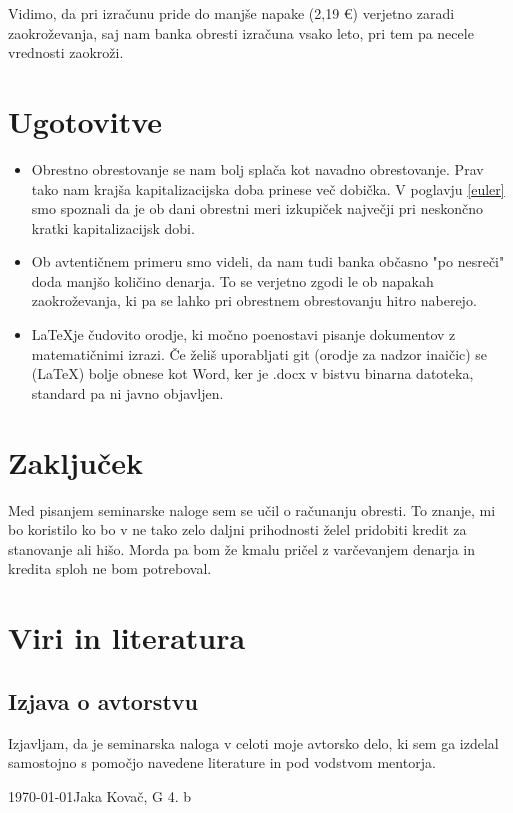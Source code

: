 \documentclass[12pt]{article}
\begin{document}
    Vidimo, da pri izračunu pride do manjše napake (2,19 €) verjetno zaradi zaokroževanja,
    saj nam banka obresti izračuna vsako leto, pri tem pa necele vrednosti zaokroži.

    \newpage

\section{Ugotovitve}
    \begin{itemize}
        \item Obrestno obrestovanje se nam bolj splača kot navadno obrestovanje. Prav tako nam
        krajša kapitalizacijska doba prinese več dobička. V poglavju \ref{euler} smo spoznali
        da je ob dani obrestni meri izkupiček največji pri neskončno kratki kapitalizacijsk dobi.
        \item Ob avtentičnem primeru smo videli, da nam tudi banka občasno "po nesreči" doda
        manjšo količino denarja. To se verjetno zgodi le ob napakah zaokroževanja, ki pa se lahko 
        pri obrestnem obrestovanju hitro naberejo.
        \item \LaTeX je čudovito orodje, ki močno poenostavi pisanje dokumentov z matematičnimi
        izrazi. Če želiš uporabljati git (orodje za nadzor inaičic) se (\LaTeX) bolje obnese kot Word,
        ker je .docx v bistvu binarna datoteka, standard pa ni javno objavljen.
    \end{itemize}

\newpage
\section{Zaključek}
    Med pisanjem seminarske naloge sem se učil o računanju obresti. To znanje, mi bo koristilo
    ko bo v ne tako zelo daljni prihodnosti želel pridobiti kredit za stanovanje ali hišo.
    Morda pa bom že kmalu pričel z varčevanjem denarja in kredita sploh ne bom potreboval. 



\newpage
\begingroup
\makeatletter
    \section{Viri in literatura}
    \nocite{*}
    \printbibliography[heading=none]
\makeatother
\endgroup
\newpage

\begin{samepage}
    \thispagestyle{empty}
    \section*{Izjava o avtorstvu}
    Izjavljam, da je seminarska naloga v celoti moje avtorsko delo, ki sem ga 
    izdelal samostojno s pomočjo navedene literature in pod vodstvom mentorja.

    \vfill
    
    \today \hfill Jaka Kovač, G 4. b
    
    \vspace{3 cm}
\end{samepage}
\end{document}
